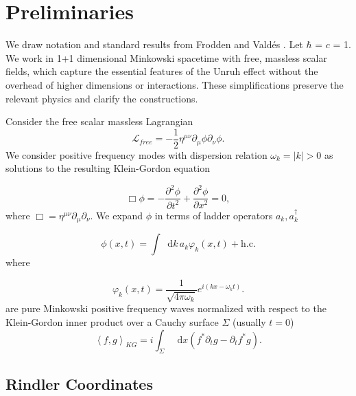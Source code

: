 \documentclass[12pt,a4paper]{article}
\newcommand*\diff{\mathop{}\!\mathrm{d}}
\begin{document}
\section{Preliminaries} \label{sec:prelim}

We draw notation and standard results from Frodden and Vald{\'{e}}s \cite{frodden2018unruh}. Let $\hbar$ = $c$ = 1. We work in 1+1 dimensional Minkowski spacetime with free, massless scalar fields, which capture the essential features of the Unruh effect without the overhead of higher dimensions or interactions. These simplifications preserve the relevant physics and clarify the constructions.

Consider the free scalar massless Lagrangian
\begin{equation}
\mathscr{L}_{free} = -\frac{1}{2} \eta^{\mu\nu}\partial_\mu \phi \partial_\nu \phi.
\end{equation}
We consider positive frequency modes with dispersion relation $\omega_k = |k| > 0$ as solutions to the resulting Klein-Gordon equation 

\begin{equation}
  \Box \phi = -\frac{\partial^2 \phi}{\partial t^2} + \frac{\partial^2 \phi}{\partial x^2} = 0,
 \label{massless-wave-eq}
\end{equation}
where $\Box = \eta^{\mu\nu} \partial_\mu \partial_\nu$. We expand $\phi$ in terms of ladder operators $a_k, a_k^\dagger$

\begin{equation}
  \phi(x,t) = \int \diff k \, a_k \varphi_k(x,t) + \text{h.c.}
\end{equation}
where

\begin{equation}
  \varphi_k(x,t) = \frac{1}{\sqrt{4\pi\omega_k}} e^{i(kx - \omega_k t)}.
\label{amode}
\end{equation}
are pure Minkowski positive frequency waves normalized with respect to the Klein-Gordon inner product over a Cauchy surface $\Sigma$ (usually $t = 0$)
\begin{equation}
  \left<f, g\right>_{KG} = i \int_\Sigma \diff x (f^* \partial_t g - \partial_t f^* g).
\end{equation}

\subsection{Rindler Coordinates} 
\end{document}
